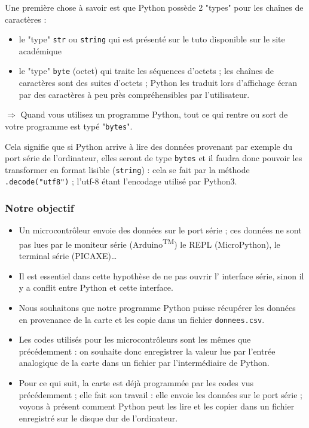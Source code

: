 \documentclass[11pt]{article}
\begin{document}
 
 \medskip
 Une première chose à savoir est que Python possède 2  "types" pour les chaînes de caractères : 
 \begin{itemize}
  \item le "type" \texttt{str} ou \texttt{string} qui est présenté sur le tuto disponible sur le site académique
  \item le "type" \texttt{byte} (octet) qui traite les séquences d'octets ; les chaînes de caractères sont des suites d'octets ; Python les traduit lors d'affichage écran par des caractères à peu près compréhensibles par l'utilisateur.
 \end{itemize}

 \medskip
$\Longrightarrow$ Quand vous utilisez un programme Python, tout ce qui rentre ou sort de votre programme est typé "\texttt{bytes}".
 
 \medskip
 
 
 Cela signifie que si Python arrive à lire des données provenant par exemple du port série de l'ordinateur, elles seront de type \texttt{bytes} et il faudra donc pouvoir les transformer en format lisible (\texttt{string}) : cela se fait par la méthode \texttt{.decode("utf8")} ; l'utf-8 étant l'encodage utilisé par Python3.
 
 
 \subsubsection{Notre objectif}
 
 
 \begin{itemize}
  \item Un microcontrôleur envoie des données sur le port série ; ces données ne sont pas lues par le moniteur série (Arduino\textsuperscript{TM}) le REPL (MicroPython), le terminal série (PICAXE)\ldots
  
  \item Il est essentiel dans cette hypothèse de ne pas ouvrir l' interface série, sinon il y a conflit entre Python et cette interface.
  \item Nous souhaitons que notre programme Python puisse récupérer les données en provenance de la carte et les copie dans un fichier \texttt{donnees.csv}.
  \item Les codes utilisés pour les microcontrôleurs sont les mêmes que précédemment : on souhaite donc enregistrer la valeur lue par l'entrée analogique de la carte dans un fichier par l'intermédiaire de Python.
  \item Pour ce qui suit, la carte est déjà programmée par les codes vus précédemment ; elle fait son travail : elle envoie les données sur le port série ; voyons à présent comment Python peut les lire et les copier dans un fichier enregistré sur le disque dur de l'ordinateur.
 
 
 \end{itemize}
\end{document}
